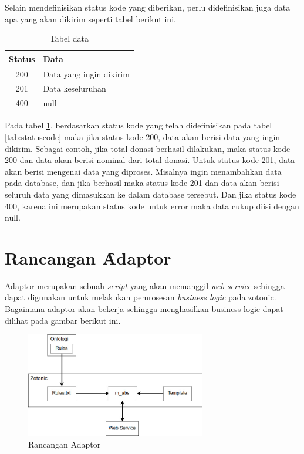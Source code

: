	Selain mendefinisikan status kode yang diberikan, perlu didefinisikan juga data apa yang akan dikirim seperti tabel berikut ini.
	
	\begin{table}
		\centering
		\caption{Tabel data}
		\label{tab:tabelData}
		\begin{tabular}{| c | l |}
			\hline
			Status & Data \\ 
			\hline
			200 & Data yang ingin dikirim \\
			201 & Data keseluruhan \\
			400 & null\\
			\hline
		\end{tabular}
	\end{table}

	Pada tabel \ref{tab:tabelData}, berdasarkan status kode yang telah didefinisikan pada tabel \ref{tab:statuscode} maka jika status kode 200, data akan berisi data yang ingin dikirim. Sebagai contoh, jika total donasi berhasil dilakukan, maka status kode 200 dan data akan berisi nominal dari total donasi. Untuk status kode 201, data akan berisi mengenai data yang diproses. Misalnya ingin menambahkan data pada database, dan jika berhasil maka status kode 201 dan data akan berisi seluruh data yang dimasukkan ke dalam database tersebut. Dan jika status kode 400, karena ini merupakan status kode untuk error maka data cukup diisi dengan null.
\section{Rancangan \f{Adaptor}}

Adaptor merupakan sebuah \textit{script} yang akan memanggil \textit{web service} sehingga dapat digunakan untuk melakukan pemrosesan \textit{business logic} pada zotonic. Bagaimana adaptor akan bekerja sehingga menghasilkan business logic dapat dilihat pada gambar berikut ini.

\begin{figure}
	\centering
	\includegraphics[width=0.7\textwidth]
		{pics/adaptor.jpg}
	\caption{Rancangan Adaptor}
	\label{fig:adaptor}
\end{figure}
\vspace{-0.3cm}

